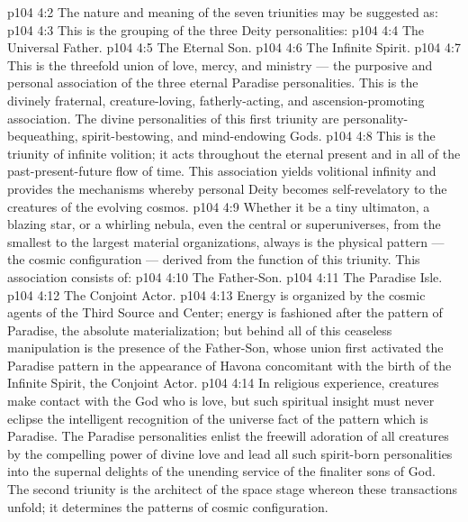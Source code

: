 \vs p104 4:2 \pc The nature and meaning of the seven triunities may be suggested as:
\vs p104 4:3 \pc {} This is the grouping of the three Deity personalities:
\vs p104 4:4 \bibnobreakspace The Universal Father.
\vs p104 4:5 \bibnobreakspace The Eternal Son.
\vs p104 4:6 \bibnobreakspace The Infinite Spirit.
\vs p104 4:7 \pc This is the threefold union of love, mercy, and ministry --- the purposive and personal association of the three eternal Paradise personalities. This is the divinely fraternal, creature\hyp{}loving, fatherly\hyp{}acting, and ascension\hyp{}promoting association. The divine personalities of this first triunity are personality\hyp{}bequeathing, spirit\hyp{}bestowing, and mind\hyp{}endowing Gods.
\vs p104 4:8 This is the triunity of infinite volition; it acts throughout the eternal present and in all of the past\hyp{}present\hyp{}future flow of time. This association yields volitional infinity and provides the mechanisms whereby personal Deity becomes self\hyp{}revelatory to the creatures of the evolving cosmos.
\vs p104 4:9 \pc {} Whether it be a tiny ultimaton, a blazing star, or a whirling nebula, even the central or superuniverses, from the smallest to the largest material organizations, always is the physical pattern --- the cosmic configuration --- derived from the function of this triunity. This association consists of:
\vs p104 4:10 \bibnobreakspace The Father\hyp{}Son.
\vs p104 4:11 \bibnobreakspace The Paradise Isle.
\vs p104 4:12 \bibnobreakspace The Conjoint Actor.
\vs p104 4:13 \pc Energy is organized by the cosmic agents of the Third Source and Center; energy is fashioned after the pattern of Paradise, the absolute materialization; but behind all of this ceaseless manipulation is the presence of the Father\hyp{}Son, whose union first activated the Paradise pattern in the appearance of Havona concomitant with the birth of the Infinite Spirit, the Conjoint Actor.
\vs p104 4:14 In religious experience, creatures make contact with the God who is love, but such spiritual insight must never eclipse the intelligent recognition of the universe fact of the pattern which is Paradise. The Paradise personalities enlist the freewill adoration of all creatures by the compelling power of divine love and lead all such spirit\hyp{}born personalities into the supernal delights of the unending service of the finaliter sons of God. The second triunity is the architect of the space stage whereon these transactions unfold; it determines the patterns of cosmic configuration.
